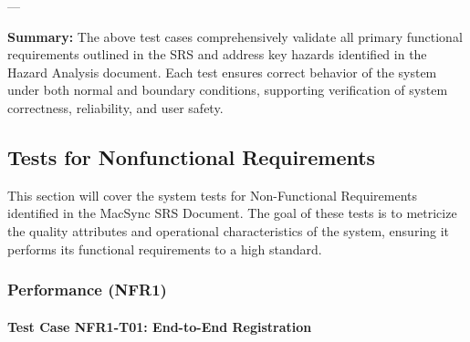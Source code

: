 \documentclass[12pt, titlepage]{article}
\begin{document}
---

\noindent\textbf{Summary:}  
The above test cases comprehensively validate all primary functional requirements outlined in the SRS and 
address key hazards identified in the Hazard Analysis document. Each test ensures correct behavior of the
system under both normal and boundary conditions, supporting verification of system correctness, reliability,
and user safety.


\subsection{Tests for Nonfunctional Requirements}

This section will cover the system tests for Non-Functional Requirements identified in the MacSync SRS Document. The goal of these tests is to metricize the quality attributes and operational characteristics of the system, ensuring it performs its functional requirements to a high standard.

\subsubsection{Performance (NFR1)}

		
\paragraph{Test Case NFR1-T01: End-to-End Registration}
\end{document}
